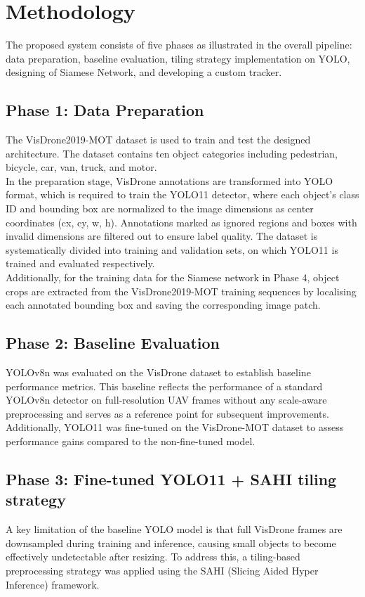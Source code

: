 \documentclass[conference]{IEEEtran}
\begin{document}
\section{Methodology}
\label{sec:method}

The proposed system consists of five phases as illustrated in the overall
pipeline: data preparation, baseline evaluation, tiling strategy implementation on YOLO, designing of Siamese Network, and developing a custom tracker.
\subsection{Phase 1: Data Preparation}

The VisDrone2019-MOT dataset is used to train and test the designed architecture. The dataset contains ten object categories including pedestrian, bicycle, car, van, truck, and motor. \\
In the preparation stage, VisDrone annotations are transformed into YOLO format, which is required to train the YOLO11 detector, where each object's class ID and bounding box are normalized to the image dimensions as center coordinates (cx, cy, w, h). Annotations marked as ignored regions and boxes with invalid dimensions are filtered out to ensure label quality. The dataset is systematically divided into training and validation sets, on which YOLO11 is trained and evaluated respectively.
\\
Additionally, for the training data for the Siamese network in Phase 4, object crops are extracted from the VisDrone2019-MOT training sequences by localising each annotated bounding box and saving the corresponding image patch.

\subsection{Phase 2: Baseline Evaluation}
YOLOv8n was evaluated on the VisDrone dataset to establish baseline performance metrics. 
This baseline reflects the performance of a standard YOLOv8n detector on full-resolution UAV frames without any scale-aware preprocessing and serves as a reference point for subsequent improvements. 
Additionally, YOLO11 was fine-tuned on the VisDrone-MOT dataset to assess performance gains compared to the non-fine-tuned model.

\subsection{Phase 3: Fine-tuned YOLO11 + SAHI tiling strategy}
A key limitation of the baseline YOLO model is that full VisDrone frames are downsampled during training and inference, causing small objects to become effectively undetectable after resizing. To address this, a tiling-based preprocessing strategy was applied using the SAHI (Slicing Aided Hyper Inference) framework.
\end{document}

